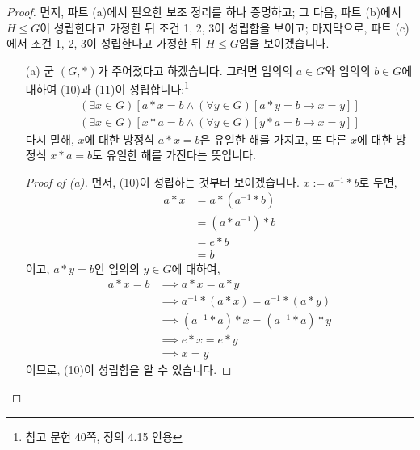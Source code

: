 \documentclass[12pt]{paper}
\begin{document}
  \begin{proof}
    먼저, 파트 (a)에서 필요한 보조 정리를 하나 증명하고;
    그 다음, 파트 (b)에서 $H \leq G$이 성립한다고 가정한 뒤 조건 1, 2, 3이 성립함을 보이고;
    마지막으로, 파트 (c)에서 조건 1, 2, 3이 성립한다고 가정한 뒤 $H \leq G$임을 보이겠습니다.

    \begin{itemize}
      \item[(a)] 군 $\left( G , * \right)$가 주어졌다고 하겠습니다.
      그러면 임의의 $a \in G$와 임의의 $b \in G$에 대하여 (10)과 (11)이 성립합니다:\footnote{참고 문헌 \cite{fraleigh2009} 40쪽, 정의 4.15 인용}
      \begin{align*}
        \left( \exists x \in G \right) \left[ a * x = b \land \left( \forall y \in G \right) \left[ a * y = b \rightarrow x = y \right] \right] \tag{10} \\
        \left( \exists x \in G \right) \left[ x * a = b \land \left( \forall y \in G \right) \left[ y * a = b \rightarrow x = y \right] \right] \tag{11}
      \end{align*}
      다시 말해, $x$에 대한 방정식 $a * x = b$은 유일한 해를 가지고,
      또 다른 $x$에 대한 방정식 $x * a = b$도 유일한 해를 가진다는 뜻입니다.

      \begin{proof}[Proof of (a)]
        먼저, (10)이 성립하는 것부터 보이겠습니다.
        $x := a^{-1} * b$로 두면,
        \begin{align*}
          a * x
          & = a * \left( a^{-1} * b \right) \\
          & = \left( a * a^{-1} \right) * b \\
          & = e * b \\
          & = b
        \end{align*}
        이고,
        $a * y = b$인 임의의 $y \in G$에 대하여,
        \begin{align*}
          a * x = b
          & \implies a * x = a * y \\
          & \implies a^{-1} * \left( a * x \right) = a^{-1} * \left( a * y \right) \\
          & \implies \left( a^{-1} * a \right) * x = \left( a^{-1} * a \right) * y \\
          & \implies e * x = e * y \\
          & \implies x = y
        \end{align*}
        이므로, (10)이 성립함을 알 수 있습니다.


\end{proof}
\end{itemize}
\end{proof}
\end{document}
